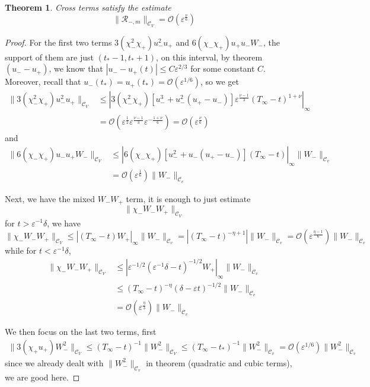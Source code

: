 \documentclass[letterpaper,11pt]{article}
\newcommand{\rmO}{\mathcal{O}}
\newcommand{\eps}{\varepsilon}
\numberwithin{equation}{section}
\theoremstyle{plain}
\newtheorem{theorem}{Theorem}[section]
\begin{document}
\begin{enumerate}
\begin{itemize}
\begin{enumerate}
\begin{theorem}
Cross terms satisfy the estimate
\[
\|\mathcal{R}_{-,m} \|_{\mathcal{C}_V} =\rmO(\eps^{\frac{\nu}{6}})
\]
\end{theorem}
\begin{proof}
For the first two terms $3(\chi_-^2\chi_+)u_-^2u_+$ and $6(\chi_-\chi_+)u_+u_-W_-$, the support of them are just $(t_*-1,t_*+1)$, on this interval, by theorem $(u_--u_+)$, we know that $|u_- - u_+(t)| \le C\eps^{2/3}$ for some constant $C$. Moreover, recall that $u_-(t_*) = u_+(t_*) = \rmO(\eps^{1/6})$, so we get
\begin{align*}
\|3(\chi_-^2\chi_+)u_-^2u_+ \|_{\mathcal{C}_V} &\le | 3(\chi_-^2\chi_+)[u_-^3+u_-^2(u_+ -u_-)]  \eps^{\frac{\nu-1}{3}}(T_\infty -t)^{1+\nu} |_{\infty} \\
& = \rmO( \eps^{\frac{1}{2}} \eps^{\frac{\nu-1}{3}} \eps^{-\frac{1+\nu}{6}} ) = \rmO(\eps^{\frac{\nu}{6}})
\end{align*}
and
\begin{align*}
\|6(\chi_-\chi_+)u_-u_+W_- \|_{\mathcal{C}_V} &\le | 6(\chi_-\chi_+) [u_-^2 +u_-(u_+-u_-)](T_\infty -t)|_{\infty} \| W_-\|_{\mathcal{C}_v} \\
& = \rmO( \eps^{\frac{1}{6}} ) \|W_-\|_{\mathcal{C}_v}
\end{align*}

Next, we have the mixed $W_-W_+$ term, it is enough to just estimate
\[
\|\chi_-W_- W_+ \|_{\mathcal{C}_V}
\]
for $ t >\eps^{-1}\delta$, we have
\[
\|\chi_-W_- W_+ \|_{\mathcal{C}_V} \le |(T_\infty-t)W_+|_\infty \| W_- \|_{\mathcal{C}_v} = |(T_\infty -t)^{-\eta+1}| \|W_-\|_{\mathcal{C}_v} = \rmO(\eps^{\frac{\eta-1}{6} })\|W_-\|_{\mathcal{C}_v} 
\]
while for $t < \eps^{-1}\delta$, 
\begin{align*}
\|\chi_-W_- W_+ \|_{\mathcal{C}_V} &\le |\eps^{-1/2}(\eps^{-1}\delta - t)^{-1/2} W_+|_\infty \|W_-\|_{\mathcal{C}_v}\\
& \le (T_\infty -t)^{-\eta}(\delta-\eps t)^{-1/2} \|W_-\|_{\mathcal{C}_v} \\
& = \rmO(\eps^{\frac{\eta}{3}}) \|W_-\|_{\mathcal{C}_v}
\end{align*}

We then focus on the last two terms, first
\begin{align*}
\|3(\chi_+u_+)W_-^2\|_{\mathcal{C}_V} \le (T_\infty -t)^{-1} \|W_-^2\|_{\mathcal{C}_V} \le (T_\infty - t_*)^{-1} \|W_-^2\|_{\mathcal{C}_v} =\rmO(\eps^{1/6})  \|W_-^2\|_{\mathcal{C}_v}
\end{align*}
since we already dealt with $\|W_-^2\|_{\mathcal{C}_v}$ in theorem (quadratic and cubic terms), we are good here.


\end{proof}
\end{enumerate}
\end{itemize}
\end{enumerate}
\end{document}
